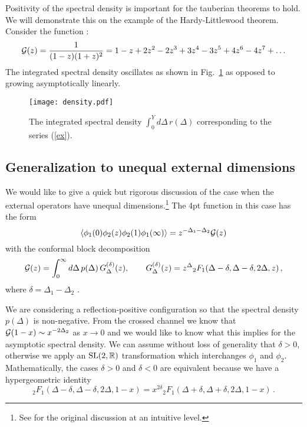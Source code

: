 \documentclass[12pt]{article}
\newcommand{\reef}[1]{(\ref{#1})}
\newcommand{\beq}{\begin{equation}}
\newcommand{\eeq}{\end{equation}}
\def\bR {\mathbb{R}}
\def\calG {{\cal G}}
\newcommand{\D}{\Delta}
\numberwithin{equation}{section}
\begin{document}
Positivity of the spectral density is important for the tauberian theorems to hold. We will demonstrate this on the example of the Hardy-Littlewood theorem. Consider the function \cite{Titchmarsh}:
\beq
\label{ex}
\calG(z) = \frac{1}{(1-z)(1+z)^2} = 1-z+2 z^2-2 z^3+3 z^4-3 z^5+4 z^6-4 z^7+\ldots
\eeq
The integrated spectral density oscillates as shown in Fig.~\ref{density} as opposed to growing asymptotically linearly.

\begin{figure}
\centering
\texttt{[image: density.pdf]}
\caption{The integrated spectral density $\int_0^Y d\Delta\,r(\D)$ corresponding to the series \reef{ex}.}
\label{density}
\end{figure}

\subsection{Generalization to unequal external dimensions}
\label{unequal}

We would like to give a quick but rigorous discussion of the case when the external operators have unequal dimensions.\footnote{See \cite{Fitzpatrick:2014vua} for the original discussion at an intuitive level.} 
The 4pt function in this case has the form
\beq
\langle \phi_1(0) \phi_2(z) \phi_2(1) \phi_1(\infty)\rangle = z^{-\D_1-\D_2} \calG(z)
\eeq
with the conformal block decomposition
\beq
\calG(z) = \int_0^\infty d\Delta\, p(\Delta)\, G^{(\delta)}_{\Delta}(z),\qquad G^{(\delta)}_\D(z)= z^\D{}_2F_{1}(\D-\delta,\D-\delta,2\D,z)\,,
\label{CBdecdelta}
\eeq
where $\delta=\Delta_1-\Delta_2$ \cite{DO3}.


We are considering a reflection-positive configuration so that the spectral density $p(\Delta)$ is non-negative. From the crossed channel we know that $\calG(1-x)\sim x^{-2\D_2}$ as $x\to 0$ and we would like to know what this implies for the asymptotic spectral density. We can assume without loss of generality that $\delta>0$, otherwise we apply an ${\rm SL}(2,\bR)$ transformation which interchanges $\phi_1$ and $\phi_2$. Mathematically, the cases $\delta>0$ and $\delta<0$ are equivalent because we have a hypergeometric identity
\beq
{}_2F_{1}(\D-\delta,\D-\delta,2\D,1-x) = x^{2\delta} {}_2F_{1}(\D+\delta,\D+\delta,2\D,1-x)\,.
\eeq
 
\end{document}
